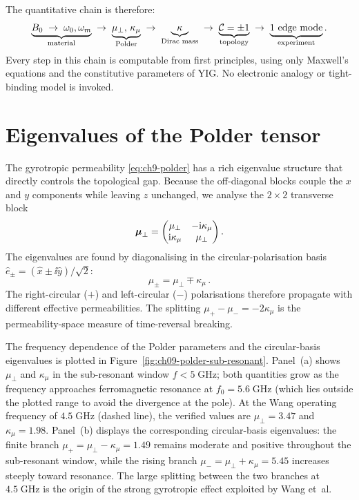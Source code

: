 The quantitative chain is therefore:
\[
  \underbrace{B_0\;\to\;\omega_0,\omega_m}_{\text{material}}
  \;\to\;
  \underbrace{\mu_\perp,\,\kappa_\mu}_{\text{Polder}}
  \;\to\;
  \underbrace{\kappa}_{\text{Dirac mass}}
  \;\to\;
  \underbrace{\mathcal{C}=\pm 1}_{\text{topology}}
  \;\to\;
  \underbrace{\text{1 edge mode}}_{\text{experiment}}.
\]
Every step in this chain is computable from first principles, using
only Maxwell's equations and the constitutive parameters of YIG.  No
electronic analogy or tight-binding model is invoked.

\section{Eigenvalues of the Polder tensor}
\label{sec:ch9-polder-eigenvalues}

The gyrotropic permeability \eqref{eq:ch9-polder} has a rich
eigenvalue structure that directly controls the topological gap.
Because the off-diagonal blocks couple the $x$ and $y$ components
while leaving $z$ unchanged, we analyse the $2\times 2$ transverse
block
\begin{equation}\label{eq:ch9-mu-transverse}
  \boldsymbol{\mu}_\perp = \begin{pmatrix}
    \mu_\perp & -\mathrm{i}\kappa_\mu \\
    \mathrm{i}\kappa_\mu & \mu_\perp
  \end{pmatrix}.
\end{equation}
The eigenvalues are found by diagonalising in the circular-polarisation
basis $\hat{e}_\pm=(\hat{x}\pm\ii\hat{y})/\sqrt{2}$:
\begin{equation}\label{eq:ch9-mu-eigenvalues}
  \mu_\pm = \mu_\perp \mp \kappa_\mu\,.
\end{equation}
The right-circular ($+$) and left-circular ($-$) polarisations
therefore propagate with different effective permeabilities.  The
splitting $\mu_+-\mu_-=-2\kappa_\mu$ is the permeability-space
measure of time-reversal breaking.

The frequency dependence of the Polder parameters and the circular-basis
eigenvalues is plotted in Figure~\ref{fig:ch09-polder-sub-resonant}.  Panel~(a)
shows $\mu_\perp$ and $\kappa_\mu$ in the sub-resonant window
$f<5\;\mathrm{GHz}$; both quantities grow as the frequency approaches
ferromagnetic resonance at $f_0=5.6\;\mathrm{GHz}$ (which lies outside
the plotted range to avoid the divergence at the pole).  At the Wang operating
frequency of $4.5\;\mathrm{GHz}$ (dashed line), the verified values are
$\mu_\perp=3.47$ and $\kappa_\mu=1.98$.  Panel~(b) displays the
corresponding circular-basis eigenvalues: the finite branch
$\mu_+=\mu_\perp-\kappa_\mu=1.49$ remains moderate and positive throughout the
sub-resonant window, while the rising branch
$\mu_-=\mu_\perp+\kappa_\mu=5.45$ increases steeply toward resonance.  The
large splitting between the two branches at $4.5\;\mathrm{GHz}$ is the
origin of the strong gyrotropic effect exploited by Wang et~al.

